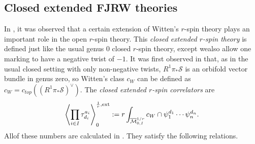 \documentclass[11pt]{amsart}
\theoremstyle{definition}
\theoremstyle{remark}
\newcommand{\<}{\left<}
\renewcommand{\>}{\right>}
\numberwithin{equation}{section}
\def\Mbar{{\overline{\mathcal M}}}
\begin{document}
\subsection{Closed extended FJRW theories}\label{subsec:closed_ext_r_m}
In \cite{BCT_Closed_Extended,BCT2}, it %
was observed that a certain extension of Witten's $r$-spin theory plays an important role in the open $r$-spin theory. This \emph{closed extended $r$-spin theory} is defined just like the %
usual genus $0$ closed %
$r$-spin %
theory, except wealso allow %
one marking to have a negative twist of $-1.$ It was first observed in \cite{JKV2} that, as in the usual closed setting with only non-negative %
twists,  $R^1\pi_*\mathcal{S}$ %
is an orbifold vector bundle in genus zero, so Witten's class $c_W$ can be %
defined  as %
$c_W=c_{top}((R^1\pi_*\mathcal{S})^\vee)$. The \textit{closed extended $r$-spin correlators} %
are
\begin{equation}\label{eq:define closed ext}
\left\langle\prod_{i\in I}\tau^{a_i}_{d_i}\right\rangle^{\frac{1}{r},\text{ext}}_0:=r\int_{\Mbar^{1/r}_{0,I}} \hspace{-0cm} c_W \cap \psi_1^{d_1} \cdots \psi_n^{d_n}.
\end{equation}
 Allof these %
numbers are calculated in \cite{BCT_Closed_Extended}. They satisfy the following relations.
\end{document}
